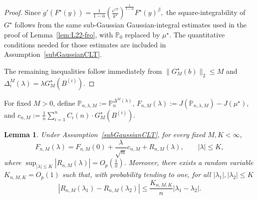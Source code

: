 \documentclass[11pt]{article}
\newtheorem{lemma}{Lemma}
\theoremstyle{definition}
\begin{document}
\begin{proof}
Since $g'\!\left(F^\star(y)\right)
=
\frac{1}{1-\alpha}
\left(
\frac{e^{rT}}{k^\star}
\right)^{\frac{1}{1-\alpha}}
F^\star(y)^\beta,$
the square-integrability of $G^\star$ follows from the same
sub-Gaussian Gaussian-integral estimates used in the proof of
Lemma~\ref{lem:L22-fro}, with $\mathbb P_0$ replaced by $\mu^\star$.
The quantitative conditions needed for those estimates are included
in Assumption~\ref{subGaussianCLT}.

The remaining inequalities follow immediately from $\|G_M^\star(b)\|_2\leq M$ and $\Delta_i^M(\lambda)
=
\lambda G_M^\star(B^{(i)}).$
\end{proof}

For fixed $M>0$, define $\mathbb P_{n,\lambda,M}
:=
\mathbb P_n^{\Delta^M(\lambda)}$, $F_{n,M}(\lambda)
:=
J(\mathbb P_{n,\lambda,M})-J(\mu^\star)$, and $c_{n,M}
:=
\frac1n
\sum_{i=1}^n
C_i(n)\cdot G_M^\star(B^{(i)}).$

\begin{lemma}\label{cor:clean-rate-explicit}
Under Assumption~\ref{subGaussianCLT}, for every fixed
$M,K<\infty$,
\[
F_{n,M}(\lambda)
=
F_{n,M}(0)
+
\frac{\lambda}{\sqrt n}c_{n,M}
+
R_{n,M}(\lambda),
\qquad
|\lambda|\leq K,
\]
where $\sup_{|\lambda|\leq K}
|R_{n,M}(\lambda)|
=
O_p\!\left(\frac1n\right).$
Moreover, there exists a random variable
$K_{n,M,K}=O_p(1)$ such that, with probability tending to one, for all $|\lambda_1|,|\lambda_2|\leq K$
\[
\left|
R_{n,M}(\lambda_1)
-
R_{n,M}(\lambda_2)
\right|
\leq
\frac{K_{n,M,K}}{n}
|\lambda_1-\lambda_2|.
\]
\end{lemma}
\end{document}

